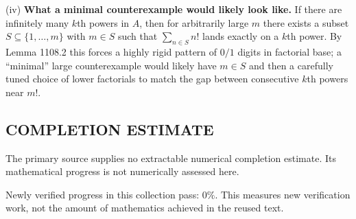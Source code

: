 (iv) \textbf{What a minimal counterexample would likely look like.}
If there are infinitely many $k$th powers in $A$, then for arbitrarily large $m$ there exists a subset $S\subseteq\{1,\dots,m\}$ with $m\in S$ such that $\sum_{n\in S} n!$ lands exactly on a $k$th power. By Lemma 1108.2 this forces a highly rigid pattern of $0/1$ digits in factorial base; a ``minimal'' large counterexample would likely have $m\in S$ and then a carefully tuned choice of lower factorials to match the gap between consecutive $k$th powers near $m!$.




\subsection*{COMPLETION ESTIMATE}
The primary source supplies no extractable numerical completion estimate. Its mathematical progress is not numerically assessed here.

Newly verified progress in this collection pass: $0\%$. This measures new verification work, not the amount of mathematics achieved in the reused text.
